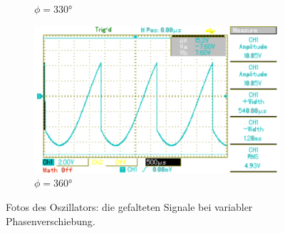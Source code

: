 \begin{figure}[p]
\begin{subfigure}{0.32\textwidth}
		\caption{$\phi=330°$}
	\end{subfigure}
	\begin{subfigure}{0.32\textwidth}
		\includegraphics[width=\textwidth]{Bilder/MAP017.pdf}
		\caption{$\phi=360°$}
	\end{subfigure}
	\caption{Fotos des Oszillators: die gefalteten Signale bei variabler Phasenverschiebung. \cite{gimp}}
	\label{fig:faltung}
\end{figure}
